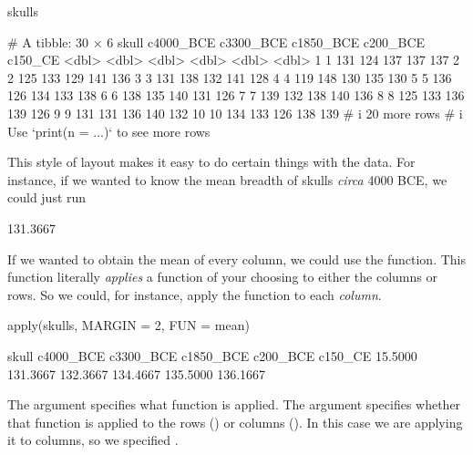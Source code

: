 \begin{inR}
skulls
\end{inR}

\begin{outR}
# A tibble: 30 × 6
   skull c4000_BCE c3300_BCE c1850_BCE c200_BCE c150_CE
   <dbl>     <dbl>     <dbl>     <dbl>    <dbl>   <dbl>
 1     1       131       124       137      137     137
 2     2       125       133       129      141     136
 3     3       131       138       132      141     128
 4     4       119       148       130      135     130
 5     5       136       126       134      133     138
 6     6       138       135       140      131     126
 7     7       139       132       138      140     136
 8     8       125       133       136      139     126
 9     9       131       131       136      140     132
10    10       134       133       126      138     139
# i 20 more rows
# i Use `print(n = ...)` to see more rows
\end{outR}

This style of layout makes it easy to do certain things with the data. For instance, if we wanted to know the mean breadth of skulls \textit{circa} 4000 BCE, we could just run 


\begin{outR}
[1] 131.3667
\end{outR}

If we wanted to obtain the mean of every column, we could use the  function. This function literally \textit{applies} a function of your choosing to either the columns or rows. So we could, for instance, apply the  function to each \textit{column}.

\begin{inR}
apply(skulls, MARGIN = 2, FUN = mean)
\end{inR}

\begin{outR}
    skull c4000_BCE c3300_BCE c1850_BCE  c200_BCE   c150_CE 
  15.5000  131.3667  132.3667  134.4667  135.5000  136.1667 
\end{outR}

\noindent
The argument  specifies what function is applied. The argument  specifies whether that function is applied to the rows () or columns (). In this case we are applying it to columns, so we specified .

